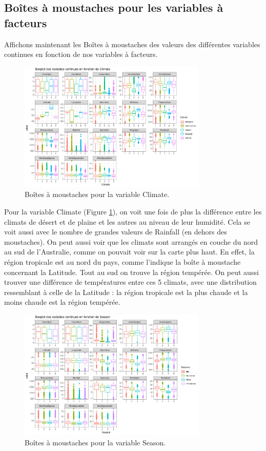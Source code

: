 \documentclass{article}
\begin{document}
\subsection{Boîtes à moustaches pour les variables à facteurs}

Affichons maintenant les Boîtes à moustaches des valeurs des différentes variables continues en fonction de nos variables à facteurs. 

\begin{figure}[htp]
    \centering
    \includegraphics[width=0.8\textwidth]{Images/boxplots/boxplot_Climate.png}
    \caption{Boîtes à moustaches pour la variable Climate.}
    \label{fig:bp_climate}
\end{figure}

Pour la variable Climate (Figure \ref{fig:bp_climate}), on voit une fois de plus la différence entre les climats de désert et de plaine et les autres au niveau de leur humidité. Cela se voit aussi avec le nombre de grandes valeurs de Rainfall (en dehors des moustaches). On peut aussi voir que les climats sont arrangés en couche du nord au sud de l'Australie, comme on pouvait voir sur la carte plus haut. En effet, la région tropicale est au nord du pays, comme l'indique la boîte à moustache concernant la Latitude. Tout au sud on trouve la région tempérée. On peut aussi trouver une différence de températures entre ces 5 climats, avec une distribution ressemblant à celle de la Latitude : la région tropicale est la plus chaude et la moins chaude est la région tempérée. 

\begin{figure}[htp]
    \centering
    \includegraphics[width=0.8\textwidth]{Images/boxplots/boxplot_Season.png}
    \caption{Boîtes à moustaches pour la variable Season.}
    \label{fig:bp_season}
\end{figure}
\end{document}
